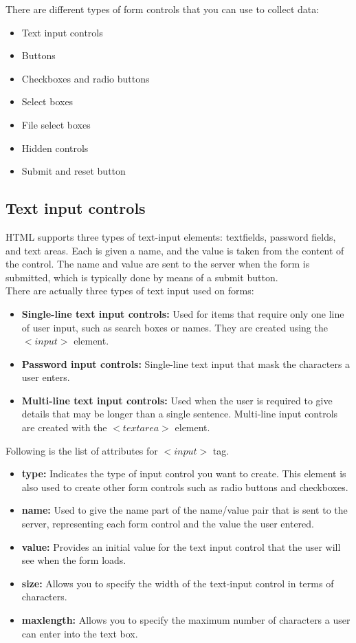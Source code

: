\documentclass[11pt,a4paper]{article}
\begin{document}
There are different types of form controls that you can use to collect data:
\begin{itemize}
\item Text input controls
\item Buttons
\item Checkboxes and radio buttons
\item Select boxes
\item File select boxes
\item Hidden controls
\item Submit and reset button
\end{itemize}

\subsection*{Text input controls}
HTML supports three types of text-input elements: textfields, password fields, and text areas. Each is given a name, and the value is taken from the content of the control.
The name and value are sent to the server when the form is submitted, which is typically done by means of a submit button.\\

There are actually three types of text input used on forms:
\begin{itemize}
\item \textbf{Single-line text input controls:} Used for items that require only one line of user input, such as search boxes or names. They are created using the $<input>$ element.
\item \textbf{Password input controls:} Single-line text input that mask the characters a user enters.
\item \textbf{Multi-line text input controls:} Used when the user is required to give details that may be longer than a single sentence. Multi-line input controls are created with the $<textarea>$ element.
\end{itemize}

Following is the list of attributes for $<input>$ tag.
\begin{itemize}
\item \textbf{type:} Indicates the type of input control you want to create. This element is also used to create other form controls such as radio buttons and checkboxes.
\item \textbf{name:} Used to give the name part of the name/value pair that is sent to the server, representing each form control and the value the user entered.
\item \textbf{value:} Provides an initial value for the text input control that the user will see when the form loads.
\item \textbf{size:} Allows you to specify the width of the text-input control in terms of characters.
\item \textbf{maxlength:} Allows you to specify the maximum number of characters a user can enter into the text box.
\end{itemize}
\end{document}

